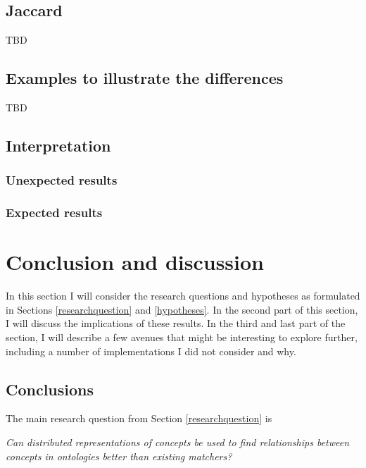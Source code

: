 \documentclass{article}
\begin{document}
  \subsection{Jaccard}
  TBD
  \subsection{Examples to illustrate the differences}
  TBD
   
 \newpage
 \subsection{Interpretation}
 \subsubsection{Unexpected results}
 \subsubsection{Expected results}
  
 \newpage
 \section{Conclusion and discussion}
 In this section I will consider the research questions and hypotheses as formulated in Sections \ref{researchquestion} and \ref{hypotheses}. In the second part of this section, I will discuss the implications of these results. In the third and last part of the section, I will describe a few avenues that might be interesting to explore further, including a number of implementations I did not consider and why.
 
 \subsection{Conclusions} \label{conclusions}
 The main research question from Section \ref{researchquestion} is
 \begin{center}
 \textit{
 Can distributed representations of concepts be used to find relationships between concepts in ontologies better than existing matchers?
 }
 \end{center}
 
\end{document}
